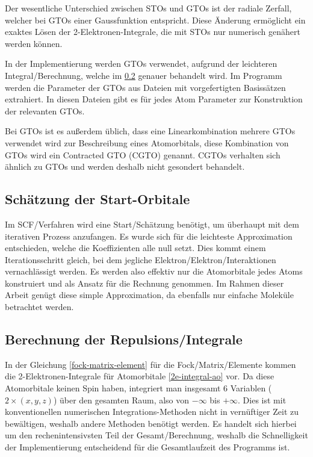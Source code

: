 \begin{enumerate}
    \cite[Ab. 6.2.1]{cramer_2004}
\end{enumerate}

Der wesentliche Unterschied zwischen STOs und GTOs ist der radiale Zerfall,
welcher bei GTOs einer Gaussfunktion entspricht.
Diese Änderung ermöglicht ein exaktes Lösen der 2-Elektronen-Integrale,
die mit STOs nur numerisch genähert werden können.\cite[6.2.1]{cramer_2004}

In der Implementierung werden GTOs verwendet, aufgrund der leichteren Integral\-/Berechnung,
welche im \cref{repulsion-integrals-section} genauer behandelt wird.
Im Programm werden die Parameter der GTOs aus Dateien mit vorgefertigten Basissätzen extrahiert.
In diesen Dateien gibt es für jedes Atom Parameter zur Konstruktion der relevanten GTOs.

Bei GTOs ist es außerdem üblich, dass eine Linearkombination mehrere GTOs verwendet wird 
zur Beschreibung eines Atomorbitals, diese Kombination von GTOs wird ein Contracted GTO (CGTO) genannt.
CGTOs verhalten sich ähnlich zu GTOs und werden deshalb nicht gesondert behandelt.
\cite[S.255-256]{lewars_2016}

\subsection{Schätzung der Start-Orbitale}
Im SCF\-/Verfahren wird eine Start\-/Schätzung benötigt, um überhaupt mit dem iterativen Prozess anzufangen.
Es wurde sich für die leichteste Approximation entschieden, welche die Koeffizienten alle null setzt.
Dies kommt einem Iterationsschritt gleich,
bei dem jegliche Elektron\-/Elektron\-/Interaktionen vernachlässigt werden.
Es werden also effektiv nur die Atomorbitale jedes Atoms konstruiert
und als Ansatz für die Rechnung genommen. Im Rahmen dieser Arbeit genügt diese simple Approximation,
da ebenfalls nur einfache Moleküle betrachtet werden.

\subsection{Berechnung der Repulsions\-/Integrale}\label{repulsion-integrals-section}
In der Gleichung \cref{fock-matrix-element} für die Fock\-/Matrix\-/Elemente kommen die
2-Elektronen-Integrale für Atomorbitale \cref{2e-integral-ao} vor.
Da diese Atomorbitale keinen Spin haben, integriert man insgesamt 6 Variablen
($2\times (x,y,z)$) über den gesamten Raum, also von $-\infty$ bis $+\infty$.
Dies ist mit konventionellen numerischen Integrations-Methoden nicht in vernüftiger Zeit
zu bewältigen, weshalb andere Methoden benötigt werden. Es handelt sich hierbei 
um den rechenintensivsten Teil der Gesamt\-/Berechnung, weshalb die Schnelligkeit
der Implementierung entscheidend für die Gesamtlaufzeit des Programms ist.

